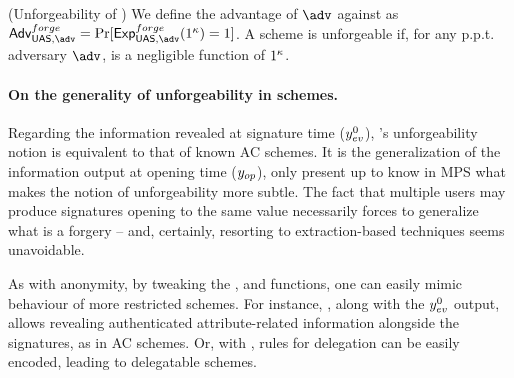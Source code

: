 

\begin{definition}{(Unforgeability of \UAS)}
  \label{def:forge-uas}  
  We define the advantage \AdvForge of $\adv$ against \ExpForge as $\AdvForge=
  \Pr\lbrack\ExpForge(1^\secpar)=1\rbrack$.
  A \UAS scheme is unforgeable if, for any p.p.t. adversary $\adv$, \AdvForge is
  a negligible function of $1^\kappa$.
\end{definition}

\paragraph{On the generality of unforgeability in \UAS schemes.} %
Regarding the information revealed at signature time ($y_{ev}^0$), \UAS's
unforgeability notion is equivalent to that of known AC schemes. It is the
generalization of the information output at opening time ($y_{op}$), only
present up to know in MPS \cite{ngsy22} what makes the notion of unforgeability
more subtle. The fact that multiple users may produce signatures opening to the
same value necessarily forces to generalize what is a forgery -- and, certainly,
resorting to extraction-based techniques seems unavoidable.

As with anonymity, by tweaking the \fissue, \feval and \finsp
functions, one can easily mimic behaviour of more restricted schemes. For
instance, \feval, along with the $y_{ev}^0$ output, allows revealing
authenticated attribute-related information alongside the signatures, as in AC
schemes. Or, with \fissue, rules for delegation can be easily encoded, leading
to delegatable schemes.

